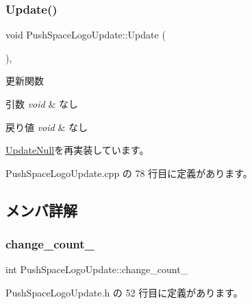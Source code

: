 \subsubsection{\texorpdfstring{Update()}{Update()}}
{\footnotesize\ttfamily void Push\+Space\+Logo\+Update\+::\+Update (\begin{DoxyParamCaption}{ }\end{DoxyParamCaption})\hspace{0.3cm}{\ttfamily [override]}, {\ttfamily [virtual]}}



更新関数 


\begin{DoxyParams}{引数}
{\em void} & なし \\
\hline
\end{DoxyParams}

\begin{DoxyRetVals}{戻り値}
{\em void} & なし \\
\hline
\end{DoxyRetVals}


\mbox{\hyperlink{class_update_null_ab3f9cabc6ddcb4ef8743f212c26be144}{Update\+Null}}を再実装しています。



 Push\+Space\+Logo\+Update.\+cpp の 78 行目に定義があります。



\subsection{メンバ詳解}
\mbox{\label{class_push_space_logo_update_abb01ae1dcc8858389d98f95509b6dff7}} 
\subsubsection{\texorpdfstring{change\+\_\+count\+\_\+}{change\_count\_}}
{\footnotesize\ttfamily int Push\+Space\+Logo\+Update\+::change\+\_\+count\+\_\+\hspace{0.3cm}{\ttfamily [private]}}



 Push\+Space\+Logo\+Update.\+h の 52 行目に定義があります。

\mbox{\label{class_push_space_logo_update_a19a827951aba3490bd1fa2d78252838a}} 
